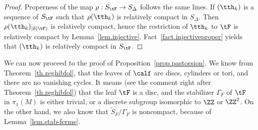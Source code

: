 \begin{proof}
Properness of the map $\rho:S_{\tF} \to S_{\Delta}$ follows the same lines. If $(\tth_k)$ is a sequence of $S_{\tF}$ such that $\rho(\tth_k)$ is relatively compact in $S_{\Delta}$. Then $\rho(\tth_k)_{|\delta(\tF)}$ is relatively compact, hence the restriction of ${\tth_k}$ to $\tF$ is relatively compact by Lemma~\ref{lem.injective}. Fact~\ref{fact.injectiveproper} yields that $(\tth_k)$ is relatively compact in $S_{\tF}$.
\end{proof}

We can now proceed to the proof of Proposition~\ref{prop.pastorsion}. We know from Theorem~\ref{th.zeghibfol}, that the leaves of $\calf$ are discs, cylinders or tori, and there are no vanishing cycles. It means (see the comment right after Theorem~\ref{th.zeghibfol}) that the leaf $\tF$ is a disc, and the stabilizer $\Gamma_F$ of $\tF $ in $\pi_1(M)$ is either trivial, or a discrete subgroup isomorphic to $\ZZ$ or $\ZZ^2$. On the other hand, we also know that $\tilde{S}_F/\Gamma_F$ is noncompact, because of Lemma~\ref{lem.stab-ferme}.
